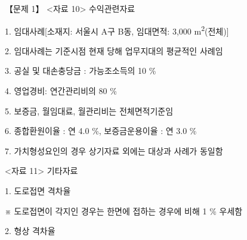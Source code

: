\begin{longquestion}{【문제 1】}
<자료 10> 수익관련자료 \par
1. 임대사례[소재지: 서울시 A구 B동, 임대면적: 3,000 m\textsuperscript{2}(전체)] \par
{\small\centering
{}\par}

2. 임대사례는 기준시점 현재 당해 업무지대의 평균적인 사례임 \par
3. 공실 및 대손충당금 : 가능조소득의 10 \% \par
4. 영업경비: 연간관리비의 80 \% \par
5. 보증금, 월임대료, 월관리비는 전체면적기준임 \par
6. 종합환원이율 : 연 4.0 \%, 보증금운용이율 : 연 3.0 \% \par
7. 가치형성요인의 경우 상기자료 외에는 대상과 사례가 동일함 \par
<자료 11> 기타자료 \par
1. 도로접면 격차율 \par
{\small\centering
{}\par}

※ 도로접면이 각지인 경우는 한면에 접하는 경우에 비해 1 \% 우세함 \par
2. 형상 격차율 \par
{\small\centering
{}\par}


\end{longquestion}
